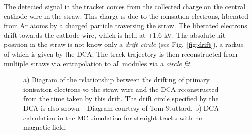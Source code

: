 \documentclass[a4paper,11pt]{article}
\begin{document}
The detected signal in the tracker comes from the collected charge on the central cathode wire in the straw. This charge is due to the ionisation electrons, liberated from Ar atoms by a charged particle traversing the straw. The liberated electrons drift towards the cathode wire, which is held at +1.6 kV. The absolute hit position in the straw is not know only a \textit{drift circle} (see Fig.~\ref{fig:drift}), a radius of which is given by the DCA. The track trajectory is then reconstructed from multiple straws via extrapolation to all modules via a \textit{circle fit}. 
\begin{figure}[!ht]
\centering
{}
    \caption{ a) Diagram of the relationship between the drifting of primary ionisation electrons to the straw wire and the DCA reconstructed from the time taken by this drift. The drift circle specified by the DCA is also shown~\cite{Tom}. Diagram courtesy of Tom Stuttard. b) DCA calculation in the MC simulation for straight tracks with no magnetic field.}
\label{fig:dca} 
\end{figure}
\end{document}
